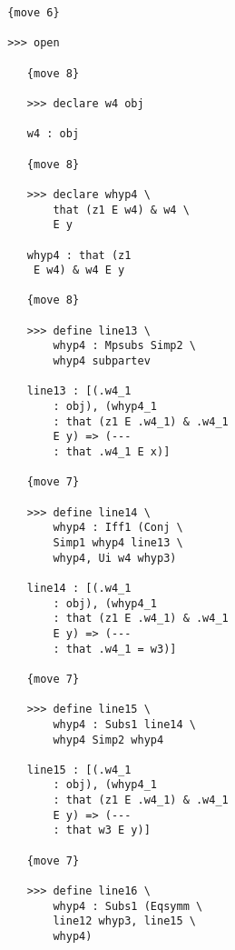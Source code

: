 \documentclass[12pt]{article}
\begin{document}
\begin{verbatim}
                     {move 6}

                     >>> open

                        {move 8}

                        >>> declare w4 obj

                        w4 : obj

                        {move 8}

                        >>> declare whyp4 \
                            that (z1 E w4) & w4 \
                            E y

                        whyp4 : that (z1 
                         E w4) & w4 E y

                        {move 8}

                        >>> define line13 \
                            whyp4 : Mpsubs Simp2 \
                            whyp4 subpartev

                        line13 : [(.w4_1 
                            : obj), (whyp4_1 
                            : that (z1 E .w4_1) & .w4_1 
                            E y) => (--- 
                            : that .w4_1 E x)]

                        {move 7}

                        >>> define line14 \
                            whyp4 : Iff1 (Conj \
                            Simp1 whyp4 line13 \
                            whyp4, Ui w4 whyp3)

                        line14 : [(.w4_1 
                            : obj), (whyp4_1 
                            : that (z1 E .w4_1) & .w4_1 
                            E y) => (--- 
                            : that .w4_1 = w3)]

                        {move 7}

                        >>> define line15 \
                            whyp4 : Subs1 line14 \
                            whyp4 Simp2 whyp4

                        line15 : [(.w4_1 
                            : obj), (whyp4_1 
                            : that (z1 E .w4_1) & .w4_1 
                            E y) => (--- 
                            : that w3 E y)]

                        {move 7}

                        >>> define line16 \
                            whyp4 : Subs1 (Eqsymm \
                            line12 whyp3, line15 \
                            whyp4)


\end{verbatim}
\end{document}
